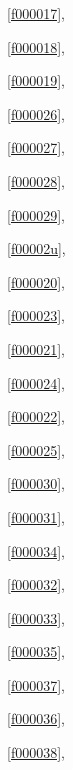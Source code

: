 \noindent\filesourcenumbernameone\ \ref{f000017},\ \pageref{f000017}%

\noindent\filesourcenumbernameone\ \ref{f000018},\ \pageref{f000018}%

\noindent\filesourcenumbernameone\ \ref{f000019},\ \pageref{f000019}%

\noindent\filesourcenumbernameone\ \ref{f000026},\ \pageref{f000026}%

\noindent\filesourcenumbernameone\ \ref{f000027},\ \pageref{f000027}%

\noindent\filesourcenumbernameone\ \ref{f000028},\ \pageref{f000028}%

\noindent\filesourcenumbernameone\ \ref{f000029},\ \pageref{f000029}%

\noindent\filesourcenumbernameone\ \ref{f00002u},\ \pageref{f00002u}%

\noindent\filesourcenumbernameone\ \ref{f000020},\ \pageref{f000020}%

\noindent\filesourcenumbernameone\ \ref{f000023},\ \pageref{f000023}%

\noindent\filesourcenumbernameone\ \ref{f000021},\ \pageref{f000021}%

\noindent\filesourcenumbernameone\ \ref{f000024},\ \pageref{f000024}%

\noindent\filesourcenumbernameone\ \ref{f000022},\ \pageref{f000022}%

\noindent\filesourcenumbernameone\ \ref{f000025},\ \pageref{f000025}%

\noindent\filesourcenumbernameone\ \ref{f000030},\ \pageref{f000030}%

\noindent\filesourcenumbernameone\ \ref{f000031},\ \pageref{f000031}%

\noindent\filesourcenumbernameone\ \ref{f000034},\ \pageref{f000034}%

\noindent\filesourcenumbernameone\ \ref{f000032},\ \pageref{f000032}%

\noindent\filesourcenumbernameone\ \ref{f000033},\ \pageref{f000033}%

\noindent\filesourcenumbernameone\ \ref{f000035},\ \pageref{f000035}%

\noindent\filesourcenumbernameone\ \ref{f000037},\ \pageref{f000037}%

\noindent\filesourcenumbernameone\ \ref{f000036},\ \pageref{f000036}%

\noindent\filesourcenumbernameone\ \ref{f000038},\ \pageref{f000038}%

